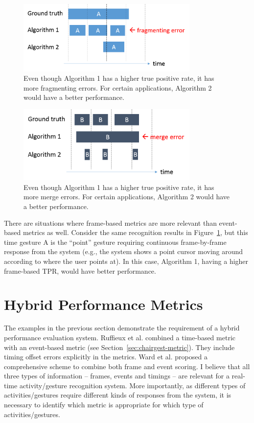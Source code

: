 \begin{figure}[tbh]
\centering
\includegraphics[width=0.8\textwidth]{figures/fragment.png}
\caption{Even though Algorithm 1 has a higher true positive rate, it has more
fragmenting errors. For certain applications, Algorithm 2 would have a better
performance.}
\label{fig:fragment}
\end{figure}

\begin{figure}[tbh]
\centering
\includegraphics[width=0.8\textwidth]{figures/merge.png}
\caption{Even though Algorithm 1 has a higher true positive rate, it has more
merge errors. For certain applications, Algorithm 2 would have a better
performance.}
\label{fig:merge}
\end{figure}

There are situations where frame-based metrics are more relevant than
event-based metrics as well. Consider the same recognition results in
Figure~\ref{fig:fragment}, but this time gesture A is the ``point'' gesture
requiring continuous frame-by-frame response from the system (e.g., the system
shows a point cursor moving around according to where the user points at). In this case,
Algorithm 1, having a higher frame-based TPR, would have
better performance.

\section{Hybrid Performance Metrics} 
The examples in the previous section demonstrate the requirement of a hybrid
performance evaluation system. Ruffieux et al. combined a time-based metric with
an event-based metric (see Section~\ref{sec:chairgest-metric}). They include timing offset errors
explicitly in the metrics. Ward et al. \cite{ward11} proposed a comprehensive
scheme to combine both frame and event scoring.
I believe that all three types of information -- frames, events and
timings -- are relevant for a real-time activity/gesture recognition system.
More importantly, as different types of activities/gestures require
different kinds of responses from the system, it is necessary to identify
which metric is appropriate for which type of activities/gestures.

